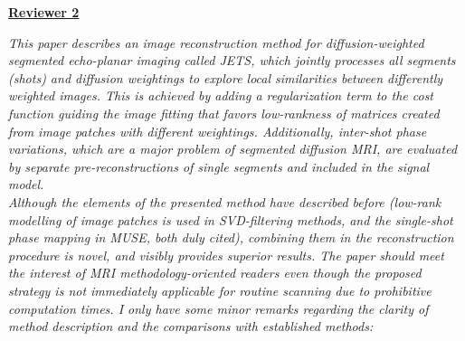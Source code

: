 \documentclass[a4paper,11pt,twoside]{report}
\begin{document}
\clearpage
\noindent \underline{\textbf{Reviewer 2}}

\textit{This paper describes an image reconstruction method for diffusion-weighted segmented echo-planar imaging called JETS, which jointly processes all segments (shots) and diffusion weightings to explore local similarities between differently weighted images. This is achieved by adding a regularization term to the cost function guiding the image fitting that favors low-rankness of matrices created from image patches with different weightings. Additionally, inter-shot phase variations, which are a major problem of segmented diffusion MRI, are evaluated by separate pre-reconstructions of single segments and included in the signal model.\\
\indent Although the elements of the presented method have described before (low-rank modelling of image patches is used in SVD-filtering methods, and the single-shot phase mapping in MUSE, both duly cited), combining them in the reconstruction procedure is novel, and visibly provides superior results. The paper should meet the interest of MRI methodology-oriented readers even though the proposed strategy is not immediately applicable for routine scanning due to prohibitive computation times. I only have some minor remarks regarding the clarity of method description and the comparisons with established methods:}

\vspace{1em}
\end{document}
